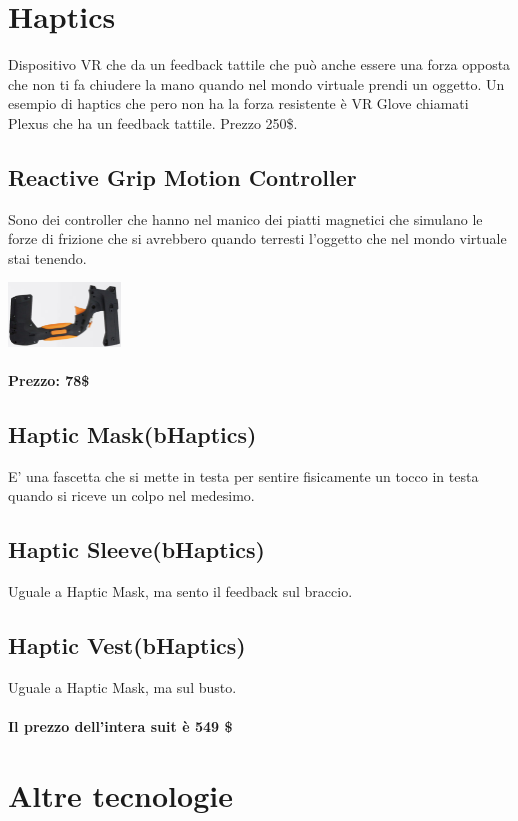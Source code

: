 \documentclass[8pt]{extarticle}
\begin{document}
\begin{multicols}{3}
\section{Haptics}
Dispositivo VR che da un feedback tattile che può anche essere una forza opposta che non ti fa chiudere la mano quando nel mondo virtuale prendi un oggetto.
Un esempio di haptics che pero non ha la forza resistente è VR Glove chiamati Plexus che ha un feedback tattile. Prezzo 250\$.
\subsection{Reactive Grip Motion Controller}
Sono dei controller che hanno nel manico dei piatti magnetici che simulano le forze di frizione che si avrebbero quando terresti l'oggetto che nel mondo virtuale stai tenendo.
\begin{center}
    \begin{minipage}{\columnwidth}
        \centering
        \includegraphics[width=3cm]{reactiveGrip.png}
    \end{minipage}
\end{center}
\paragraph{Prezzo: 78\$}
\subsection{Haptic Mask(bHaptics)}
E' una fascetta che si mette in testa per sentire fisicamente un tocco in testa quando si riceve un colpo nel medesimo.
\subsection{Haptic Sleeve(bHaptics)}
Uguale a Haptic Mask, ma sento il feedback sul braccio.
\subsection{Haptic Vest(bHaptics)}
Uguale a Haptic Mask, ma sul busto.
\paragraph{Il prezzo dell'intera suit è 549 \$} 
\section{Altre tecnologie}

\end{multicols}
\end{document}
